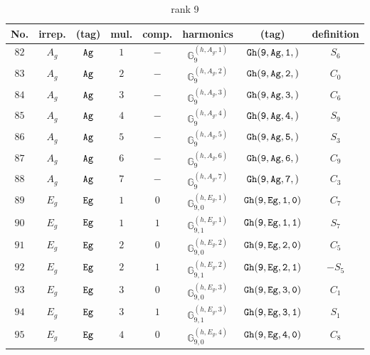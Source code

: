 \documentclass[fleqn,8pt]{jsarticle}
\begin{document}
\begin{table}[ht!]
\begin{center}
\caption{rank 9}
\renewcommand{\arraystretch}{1.3}
\begin{tabular}{cccccccc} \hline \hline
No. & irrep. & (tag) & mul. & comp. & harmonics & (tag) & definition \\ \hline
$ 82 $ & $ A_{g} $ & $ {\tt Ag} $ & $ 1 $ & $ - $ & $ \mathbb{G}_{9}^{(h,A_{g},1)} $ & $ {\tt Gh(9,Ag,1,)} $ & $ S_{6} $ \\
$ 83 $ & $ A_{g} $ & $ {\tt Ag} $ & $ 2 $ & $ - $ & $ \mathbb{G}_{9}^{(h,A_{g},2)} $ & $ {\tt Gh(9,Ag,2,)} $ & $ C_{0} $ \\
$ 84 $ & $ A_{g} $ & $ {\tt Ag} $ & $ 3 $ & $ - $ & $ \mathbb{G}_{9}^{(h,A_{g},3)} $ & $ {\tt Gh(9,Ag,3,)} $ & $ C_{6} $ \\
$ 85 $ & $ A_{g} $ & $ {\tt Ag} $ & $ 4 $ & $ - $ & $ \mathbb{G}_{9}^{(h,A_{g},4)} $ & $ {\tt Gh(9,Ag,4,)} $ & $ S_{9} $ \\
$ 86 $ & $ A_{g} $ & $ {\tt Ag} $ & $ 5 $ & $ - $ & $ \mathbb{G}_{9}^{(h,A_{g},5)} $ & $ {\tt Gh(9,Ag,5,)} $ & $ S_{3} $ \\
$ 87 $ & $ A_{g} $ & $ {\tt Ag} $ & $ 6 $ & $ - $ & $ \mathbb{G}_{9}^{(h,A_{g},6)} $ & $ {\tt Gh(9,Ag,6,)} $ & $ C_{9} $ \\
$ 88 $ & $ A_{g} $ & $ {\tt Ag} $ & $ 7 $ & $ - $ & $ \mathbb{G}_{9}^{(h,A_{g},7)} $ & $ {\tt Gh(9,Ag,7,)} $ & $ C_{3} $ \\
$ 89 $ & $ E_{g} $ & $ {\tt Eg} $ & $ 1 $ & $ 0 $ & $ \mathbb{G}_{9,0}^{(h,E_{g},1)} $ & $ {\tt Gh(9,Eg,1,0)} $ & $ C_{7} $ \\
$ 90 $ & $ E_{g} $ & $ {\tt Eg} $ & $ 1 $ & $ 1 $ & $ \mathbb{G}_{9,1}^{(h,E_{g},1)} $ & $ {\tt Gh(9,Eg,1,1)} $ & $ S_{7} $ \\
$ 91 $ & $ E_{g} $ & $ {\tt Eg} $ & $ 2 $ & $ 0 $ & $ \mathbb{G}_{9,0}^{(h,E_{g},2)} $ & $ {\tt Gh(9,Eg,2,0)} $ & $ C_{5} $ \\
$ 92 $ & $ E_{g} $ & $ {\tt Eg} $ & $ 2 $ & $ 1 $ & $ \mathbb{G}_{9,1}^{(h,E_{g},2)} $ & $ {\tt Gh(9,Eg,2,1)} $ & $ - S_{5} $ \\
$ 93 $ & $ E_{g} $ & $ {\tt Eg} $ & $ 3 $ & $ 0 $ & $ \mathbb{G}_{9,0}^{(h,E_{g},3)} $ & $ {\tt Gh(9,Eg,3,0)} $ & $ C_{1} $ \\
$ 94 $ & $ E_{g} $ & $ {\tt Eg} $ & $ 3 $ & $ 1 $ & $ \mathbb{G}_{9,1}^{(h,E_{g},3)} $ & $ {\tt Gh(9,Eg,3,1)} $ & $ S_{1} $ \\
$ 95 $ & $ E_{g} $ & $ {\tt Eg} $ & $ 4 $ & $ 0 $ & $ \mathbb{G}_{9,0}^{(h,E_{g},4)} $ & $ {\tt Gh(9,Eg,4,0)} $ & $ C_{8} $ \\

\end{tabular}
\end{center}
\end{table}
\end{document}
